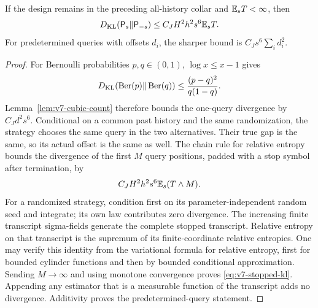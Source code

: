 \begin{lemma}
\label{lem:v7-stopped-kl}
If the design remains in the preceding all-history collar and $\mathbb E_sT<\infty$, then
\begin{equation}\label{eq:v7-stopped-kl}
 D_{\rm KL}(\mathsf P_s\Vert\mathsf P_{-s})
                         \le C_JH^2h^2s^6\mathbb E_sT.
\end{equation}
For predetermined queries with offsets $d_i$, the sharper bound is $C_Js^6\sum_i d_i^2$.
\end{lemma}
\begin{proof}
For Bernoulli probabilities $p,q\in(0,1)$, $\log x\le x-1$ gives
\[
 D_{\rm KL}(\operatorname{Ber}(p)\Vert\operatorname{Ber}(q))
 \le\frac{(p-q)^2}{q(1-q)}.
\]
Lemma~\ref{lem:v7-cubic-count} therefore bounds the one-query divergence by $C_Jd^2s^6$. Conditional on a common past history and the same randomization, the strategy chooses the same query in the two alternatives. Their true gap is the same, so its actual offset is the same as well. The chain rule for relative entropy bounds the divergence of the first $M$ query positions, padded with a stop symbol after termination, by
\[
            C_JH^2h^2s^6\mathbb E_s(T\wedge M).
\]
For a randomized strategy, condition first on its parameter-independent random seed and integrate; its own law contributes zero divergence. The increasing finite transcript sigma-fields generate the complete stopped transcript. Relative entropy on that transcript is the supremum of its finite-coordinate relative entropies. One may verify this identity from the variational formula for relative entropy, first for bounded cylinder functions and then by bounded conditional approximation. Sending $M\to\infty$ and using monotone convergence proves \eqref{eq:v7-stopped-kl}. Appending any estimator that is a measurable function of the transcript adds no divergence. Additivity proves the predetermined-query statement.
\end{proof}

